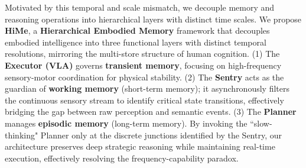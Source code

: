 Motivated by this temporal and scale mismatch, we decouple memory and reasoning operations into hierarchical layers with distinct time scales.
We propose \textbf{HiMe}, a \textbf{Hierarchical Embodied Memory} framework that decouples embodied intelligence into three functional layers with distinct temporal resolutions, mirroring the multi-store structure of human cognition. 
(1) The \textbf{Executor (VLA)} governs \textbf{transient memory}, focusing on high-frequency sensory-motor coordination for physical stability. 
(2) The \textbf{Sentry} acts as the guardian of \textbf{working memory} (short-term memory); it asynchronously filters the continuous sensory stream to identify critical state transitions, effectively bridging the gap between raw perception and semantic events. 
(3) The \textbf{Planner} manages \textbf{episodic memory} (long-term memory). 
By invoking the ``slow-thinking" Planner only at the discrete junctions identified by the Sentry, our architecture preserves deep strategic reasoning while maintaining real-time execution, effectively resolving the frequency-capability paradox.







